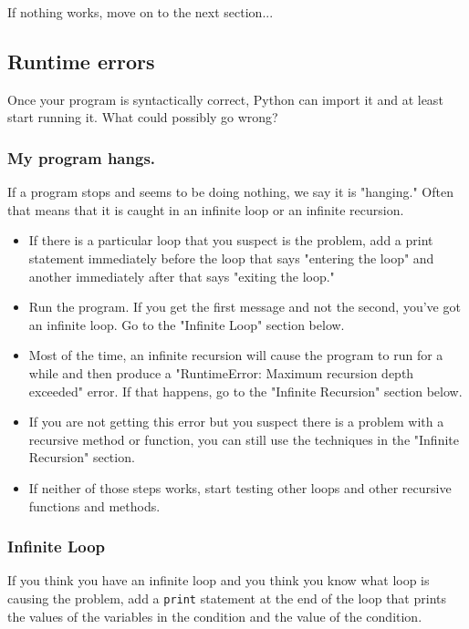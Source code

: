 \documentclass[11pt]{article}
\providecommand{\tightlist}{%
      \setlength{\itemsep}{0pt}\setlength{\parskip}{0pt}}
\begin{document}
If nothing works, move on to the next section...

    \subsection{Runtime errors}\label{runtime-errors}

Once your program is syntactically correct, Python can import it and at
least start running it. What could possibly go wrong?

\subsubsection{My program hangs.}\label{my-program-hangs.}

If a program stops and seems to be doing nothing, we say it is
"hanging." Often that means that it is caught in an infinite loop or an
infinite recursion.

\begin{itemize}
\tightlist
\item
  If there is a particular loop that you suspect is the problem, add a
  print statement immediately before the loop that says "entering the
  loop" and another immediately after that says "exiting the loop."
\item
  Run the program. If you get the first message and not the second,
  you've got an infinite loop. Go to the "Infinite Loop" section below.
\item
  Most of the time, an infinite recursion will cause the program to run
  for a while and then produce a "RuntimeError: Maximum recursion depth
  exceeded" error. If that happens, go to the "Infinite Recursion"
  section below.
\item
  If you are not getting this error but you suspect there is a problem
  with a recursive method or function, you can still use the techniques
  in the "Infinite Recursion" section.
\item
  If neither of those steps works, start testing other loops and other
  recursive functions and methods.
\end{itemize}

    \subsubsection{Infinite Loop}\label{infinite-loop}

If you think you have an infinite loop and you think you know what loop
is causing the problem, add a \texttt{print} statement at the end of the
loop that prints the values of the variables in the condition and the
value of the condition.
\end{document}
